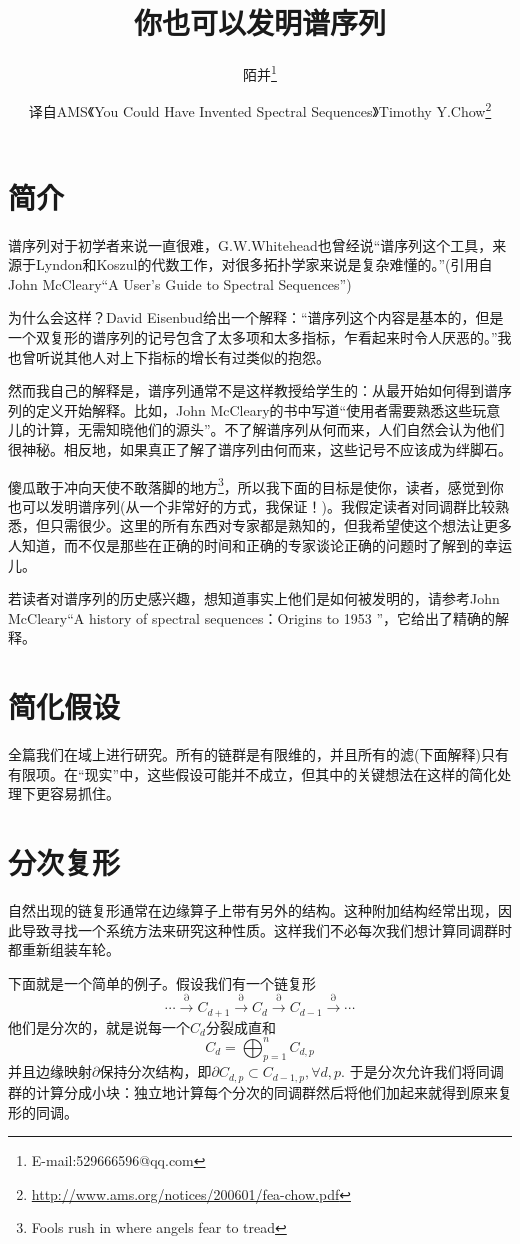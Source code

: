 \documentclass[a4paper,11pt,openany]{ctexart}
\author{\kaishu \zihao{4}陌并\thanks{E-mail:529666596@qq.com}}
\title{\heiti\zihao{-2}你也可以发明谱序列}
\date{\kaishu \zihao{-4}译自AMS《You Could Have Invented Spectral Sequences》Timothy Y.Chow\footnote{\url{http://www.ams.org/notices/200601/fea-chow.pdf}}}
\begin{document}
  \maketitle
 \section{简介}
 谱序列对于初学者来说一直很难，G.W.Whitehead也曾经说“谱序列这个工具，来源于Lyndon和Koszul的代数工作，对很多拓扑学家来说是复杂难懂的。”(引用自John McCleary“A User's Guide to Spectral Sequences”)

 为什么会这样？David Eisenbud给出一个解释：“谱序列这个内容是基本的，但是一个双复形的谱序列的记号包含了太多项和太多指标，乍看起来时令人厌恶的。”我也曾听说其他人对上下指标的增长有过类似的抱怨。

 然而我自己的解释是，谱序列通常不是这样教授给学生的：从最开始如何得到谱序列的定义开始解释。比如，John McCleary的书中写道“使用者需要熟悉这些玩意儿的计算，无需知晓他们的源头”。不了解谱序列从何而来，人们自然会认为他们很神秘。相反地，如果真正了解了谱序列由何而来，这些记号不应该成为绊脚石。

傻瓜敢于冲向天使不敢落脚的地方\footnote{Fools rush in where angels fear to tread}，所以我下面的目标是使你，读者，感觉到你也可以发明谱序列(从一个非常好的方式，我保证！)。我假定读者对同调群比较熟悉，但只需很少。这里的所有东西对专家都是熟知的，但我希望使这个想法让更多人知道，而不仅是那些在正确的时间和正确的专家谈论正确的问题时了解到的幸运儿。

若读者对谱序列的历史感兴趣，想知道事实上他们是如何被发明的，请参考John McCleary“A history of spectral sequences：Origins to 1953 ”，它给出了精确的解释。
\section{简化假设}
全篇我们在域上进行研究。所有的链群是有限维的，并且所有的滤(下面解释)只有有限项。在“现实”中，这些假设可能并不成立，但其中的关键想法在这样的简化处理下更容易抓住。
\section{分次复形}
自然出现的链复形通常在边缘算子上带有另外的结构。这种附加结构经常出现，因此导致寻找一个系统方法来研究这种性质。这样我们不必每次我们想计算同调群时都重新组装车轮。

下面就是一个简单的例子。假设我们有一个链复形
\[
    \cdots\xrightarrow{\partial} C_{d+1} \xrightarrow{\partial}C_d\xrightarrow{\partial}C_{d-1} \xrightarrow{\partial} \cdots
   \]
他们是分次的，就是说每一个$C_d$分裂成直和
\[C_d=\bigoplus_{p=1}^n C_{d,p}\]
并且边缘映射$\partial$保持分次结构，即$\partial C_{d,p}\subset C_{d-1,p},\forall d,p$. 于是分次允许我们将同调群的计算分成小块：独立地计算每个分次的同调群然后将他们加起来就得到原来复形的同调。
\end{document}
